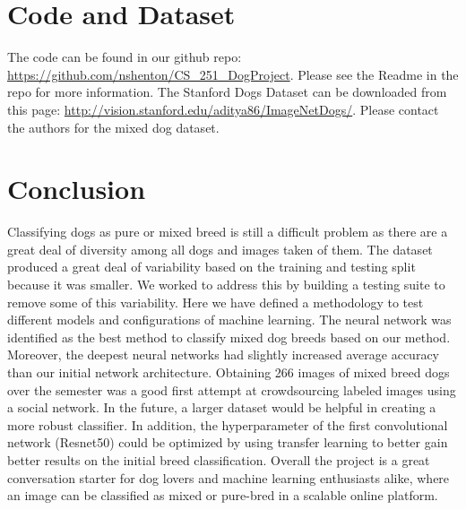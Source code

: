 \documentclass[12pt]{article}
\begin{document}
\section{Code and Dataset}

The code can be found in our github repo: \url{https://github.com/nshenton/CS_251_DogProject}. Please see the Readme in the repo for more information. The Stanford Dogs Dataset can be downloaded from this page: \url{http://vision.stanford.edu/aditya86/ImageNetDogs/}. Please contact the authors for the mixed dog dataset.

\section{Conclusion}

Classifying dogs as pure or mixed breed is still a difficult problem as there are a great deal of diversity among all dogs and images taken of them. The dataset produced a great deal of variability based on the training and testing split because it was smaller. We worked to address this by building a testing suite to remove some of this variability. Here we have defined a methodology to test different models and configurations of machine learning. The neural network was identified as the best method to classify mixed dog breeds based on our method. Moreover, the deepest neural networks had slightly increased average accuracy than our initial network architecture. Obtaining 266 images of mixed breed dogs over the semester was a good first attempt at crowdsourcing labeled images using a social network. In the future, a larger dataset would be helpful in creating a more robust classifier. In addition, the hyperparameter of the first convolutional network (Resnet50) could be optimized by using transfer learning to better gain better results on the initial breed classification. Overall the project is a great conversation starter for dog lovers and machine learning enthusiasts alike, where an image can be classified as mixed or pure-bred in a scalable online platform. 

\nocite{*}
{}

\end{document}
